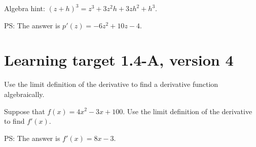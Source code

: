 Algebra hint: $(z+h)^3 = z^3 + 3z^2 h + 3z h^2 + h^3$.

\vfill

PS: The answer is $p'(z) = -6z^2 + 10z - 4.$

\pagebreak

\section{Learning target 1.4-A, version 4}

Use the limit definition of the derivative to find a derivative function algebraically.

\hrulefill

Suppose that  \(f(x)=4x^2-3x+100\). Use the limit definition of the derivative to find $f'(x)$.

\vfill

PS: The answer is $f'(x) = 8x - 3.$


